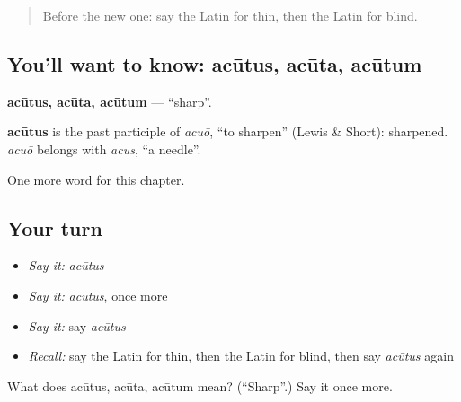 \label{lesson:LA-C144-acutus}



\begin{quote}
Before the new one: say the Latin for thin, then the Latin for blind.
\end{quote}

\subsection*{You'll want to know: acūtus, acūta, acūtum}
\textbf{acūtus, acūta, acūtum} — \textquotedblleft{}sharp\textquotedblright{}.

\begin{cousinweb}
\textbf{acūtus} is the past participle of \emph{acuō}, \textquotedblleft{}to sharpen\textquotedblright{} (Lewis \& Short): sharpened. \emph{acuō} belongs with \emph{acus}, \textquotedblleft{}a needle\textquotedblright{}.
\end{cousinweb}

\begin{grammarlens}[title={What you've built}]
One more word for this chapter.
\end{grammarlens}

\subsection*{Your turn}
\begin{itemize}
\raggedright
  \item \emph{Say it:} \emph{acūtus}
  \item \emph{Say it:} \emph{acūtus}, once more
  \item \emph{Say it:} say \emph{acūtus}
  \item \emph{Recall:} say the Latin for thin, then the Latin for blind, then say \emph{acūtus} again
\end{itemize}

\begin{tcolorbox}[breakable,colback=teal!4,colframe=teal!35!black,title={Before you move on}]
What does acūtus, acūta, acūtum mean? (\textquotedblleft{}Sharp\textquotedblright{}.) Say it once more.
\end{tcolorbox}
